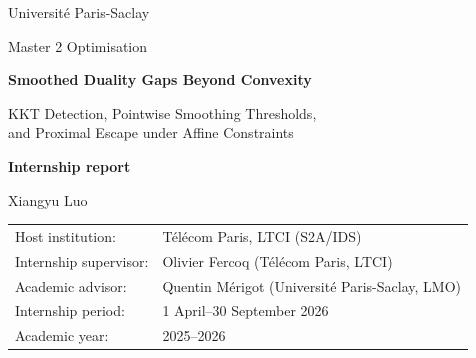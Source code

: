\documentclass[11pt,a4paper]{article}
\numberwithin{equation}{section}
\numberwithin{figure}{section}
\numberwithin{table}{section}
\numberwithin{algorithm}{section}
\theoremstyle{definition}
\theoremstyle{remark}
\begin{document}
\hypersetup{pageanchor=false}

\begin{titlepage}
  \centering
  \vspace*{1.2cm}
  {\Large Universit\'e Paris-Saclay\par}
  \vspace{0.25cm}
  {\large Master 2 Optimisation\par}
  \vspace{1.8cm}
  {\huge\bfseries Smoothed Duality Gaps Beyond Convexity\par}
  \vspace{0.35cm}
  {\Large KKT Detection, Pointwise Smoothing Thresholds,\\
  and Proximal Escape under Affine Constraints\par}
  \vspace{1.7cm}
  {\Large\bfseries Internship report\par}
  \vspace{0.45cm}
  {\large Xiangyu Luo\par}
  \vfill
  \begin{tabular}{@{}ll@{}}
    Host institution: & T\'el\'ecom Paris, LTCI (S2A/IDS)\\
    Internship supervisor: & Olivier Fercoq (T\'el\'ecom Paris, LTCI)\\
    Academic advisor: & Quentin M\'erigot (Universit\'e Paris-Saclay, LMO)\\
    Internship period: & 1 April--30 September 2026\\
    Academic year: & 2025--2026
  \end{tabular}
  \vfill
\end{titlepage}

\hypersetup{pageanchor=true}

\clearpage
\setcounter{tocdepth}{2}
\tableofcontents
\clearpage
{}










\begingroup
\small
\setlength{\bibsep}{0pt}
  

\endgroup
\end{document}
